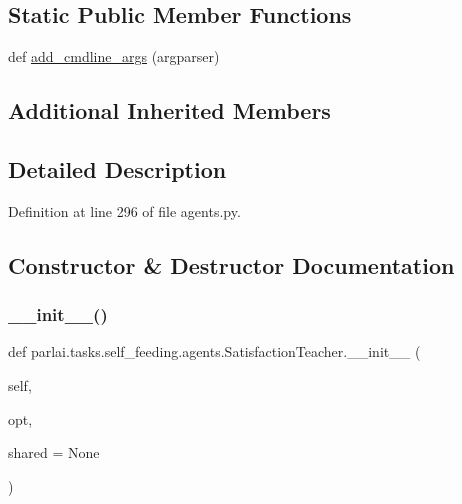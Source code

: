 \subsection*{Static Public Member Functions}
\begin{DoxyCompactItemize}
\item 
def \hyperlink{classparlai_1_1tasks_1_1self__feeding_1_1agents_1_1SatisfactionTeacher_a600955877888a602a2d83396248bde1a}{add\+\_\+cmdline\+\_\+args} (argparser)
\end{DoxyCompactItemize}
\subsection*{Additional Inherited Members}


\subsection{Detailed Description}


Definition at line 296 of file agents.\+py.



\subsection{Constructor \& Destructor Documentation}
\mbox{\label{classparlai_1_1tasks_1_1self__feeding_1_1agents_1_1SatisfactionTeacher_a10347310a1ea657acd9f44a7d35e7e1c}} 
\subsubsection{\texorpdfstring{\+\_\+\+\_\+init\+\_\+\+\_\+()}{\_\_init\_\_()}}
{\footnotesize\ttfamily def parlai.\+tasks.\+self\+\_\+feeding.\+agents.\+Satisfaction\+Teacher.\+\_\+\+\_\+init\+\_\+\+\_\+ (\begin{DoxyParamCaption}\item[{}]{self,  }\item[{}]{opt,  }\item[{}]{shared = {\ttfamily None} }\end{DoxyParamCaption})}



